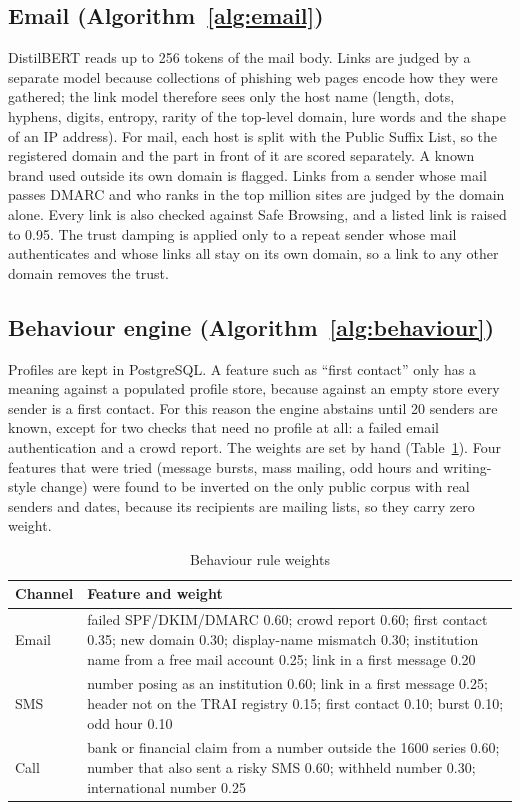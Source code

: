 {\subsection{Email (Algorithm~\ref{alg:email})}
DistilBERT reads up to 256 tokens of the mail body. Links are judged by a separate model because collections of phishing web pages encode how they were gathered; the link model therefore sees only the host name (length, dots, hyphens, digits, entropy, rarity of the top-level domain, lure words and the shape of an IP address). For mail, each host is split with the Public Suffix List, so the registered domain and the part in front of it are scored separately. A known brand used outside its own domain is flagged. Links from a sender whose mail passes DMARC and who ranks in the top million sites are judged by the domain alone. Every link is also checked against Safe Browsing, and a listed link is raised to 0.95. The trust damping is applied only to a repeat sender whose mail authenticates and whose links all stay on its own domain, so a link to any other domain removes the trust.

\subsection{Behaviour engine (Algorithm~\ref{alg:behaviour})}
Profiles are kept in PostgreSQL. A feature such as ``first contact'' only has a meaning against a populated profile store, because against an empty store every sender is a first contact. For this reason the engine abstains until 20 senders are known, except for two checks that need no profile at all: a failed email authentication and a crowd report. The weights are set by hand (Table~\ref{tab:beh}). Four features that were tried (message bursts, mass mailing, odd hours and writing-style change) were found to be inverted on the only public corpus with real senders and dates, because its recipients are mailing lists, so they carry zero weight.

\begin{table}[H]
\caption{Behaviour rule weights}
\label{tab:beh}
\centering\small{}
\begin{tabular}{|p{2cm}|p{12.2cm}|}
\hline
\textbf{Channel} & \textbf{Feature and weight} \\ \hline
Email & failed SPF/DKIM/DMARC 0.60; crowd report 0.60; first contact 0.35; new domain 0.30; display-name mismatch 0.30; institution name from a free mail account 0.25; link in a first message 0.20 \\ \hline
SMS & number posing as an institution 0.60; link in a first message 0.25; header not on the TRAI registry 0.15; first contact 0.10; burst 0.10; odd hour 0.10 \\ \hline
Call & bank or financial claim from a number outside the 1600 series 0.60; number that also sent a risky SMS 0.60; withheld number 0.30; international number 0.25 \\ \hline
\end{tabular}
\end{table}

}
